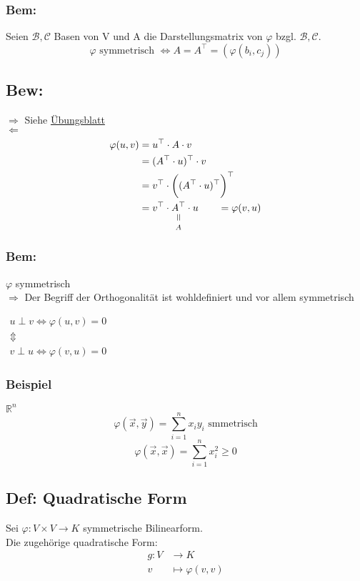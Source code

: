 \documentclass[titlepage,12pt,a4paper,ngerman]{report}
\newcommand{\verteq}{\rotatebox{90}{$\,=$}}
\newcommand{\equalto}[2]{\underset{\scriptstyle\overset{\mkern4mu\verteq}{#2}}{#1}}
\newcommand{\tx}[1]{\textrm{#1}}
\begin{document}
\subsubsection*{Bem:}
Seien $ \mathcal{B},\mathcal{C} $ Basen von V und A die Darstellungsmatrix von $ \varphi $ bzgl. $ \mathcal{B},\mathcal{C} $.
$$ \varphi \tx{ symmetrisch } \Leftrightarrow A = A^\top = (\varphi(b_i,c_j))$$
\subsection{Bew:}
$\boxed{\Rightarrow}$ Siehe \underline{Übungsblatt}\\
$\boxed{\Leftarrow}$\\
\begin{align*}
\varphi(u,v) & = u^\top \cdot A \cdot v \\
& = (A^\top \cdot u)^\top \cdot v\\
& = v^\top \cdot \bigg( ( A^\top \cdot u)^\top \bigg)^\top\\
& = v^\top \cdot \equalto{A^\top}{A} \cdot u \qquad = \varphi(v,u) 
\end{align*}
\subsubsection*{Bem:}
$ \varphi $ symmetrisch\\
$ \Rightarrow $ Der Begriff der Orthogonalität ist wohldefiniert und vor allem symmetrisch
\begin{center}
	$\begin{array}{c}
	u \perp v \Leftrightarrow \varphi(u,v) = 0\\
	\Updownarrow\\
	v \perp u \Leftrightarrow \varphi(v,u) = 0
	\end{array}$
\end{center}
\subsubsection{Beispiel}
$ \mathbb{R}^n $\\
$$\varphi(\vec{x},\vec{y}) = \sum_{i=1}^{n} x_i y_i \tx{ smmetrisch}$$ 
$$\varphi(\vec{x},\vec{x}) = \sum_{i=1}^{n} x_i^2 \ge 0$$
\subsection{Def: Quadratische Form}
Sei $ \varphi: V \times V \to K $ symmetrische Bilinearform.\\
Die zugehörige quadratische Form:
\begin{align*}
g: V &\to K\\
v &\mapsto \varphi(v,v)
\end{align*}
\end{document}
